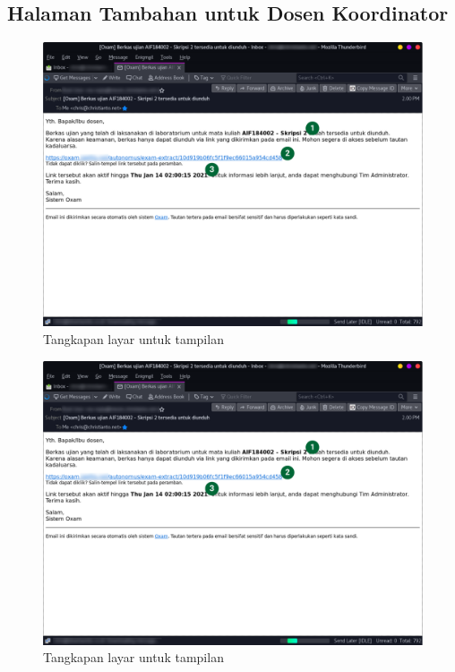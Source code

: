     \subsection{Halaman Tambahan untuk Dosen Koordinator}
    \begin{figure}
        \centering
        \includegraphics{Gambar/implemented-interface/extra/extractor-email.png}
        \caption{Tangkapan layar untuk tampilan }
        \label{fig:screenshot-extra-}
    \end{figure}
    \begin{figure}
        \centering
        \includegraphics{Gambar/implemented-interface/extra/extractor-email.png}
        \caption{Tangkapan layar untuk tampilan }
        \label{fig:screenshot-extra-}
    \end{figure}

